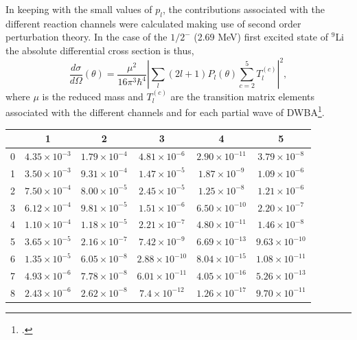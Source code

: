  
 In keeping with the small values of $p_l$,  the  contributions associated with the different reaction channels were calculated making use of second order perturbation theory. In the case of the $1/2^-$ (2.69 MeV) first excited state of $^9$Li the absolute differential cross section is thus,
 \begin{equation}
 \frac{d\sigma}{d\Omega}(\theta)=\frac{\mu^2}{16\pi^3\hbar^4}\left|\sum_l(2l+1)P_l(\theta)\sum_{c=2}^5 T^{(c)}_l\right|^2,
 \end{equation}
 where $\mu$ is the reduced mass and $T^{(c)}_l$ are the transition matrix elements associated with the different channels and for each partial wave of DWBA\footnote{\cite{Satchler:80}.}.
 
 \begin{table}
 	\begin{center}
 		\begin{tabular}{|c|c|c|c|c|c|}
 			\hline
 			\backslashbox {$l$}{$c$} & \textbf{1} & \textbf{2} & \textbf{3} & \textbf{4}& \textbf{5} \\
 			\hline
 			0& $4.35\times 10^{-3}$ &$1.79\times 10^{-4}$ & $4.81\times 10^{-6}$& $2.90\times 10^{-11}$& $3.79\times 10^{-8}$\\
 			\hline
 			1& $3.50\times 10^{-3}$& $9.31\times 10^{-4}$& $1.47\times 10^{-5}$&$1.87\times 10^{-9}$& $1.09\times 10^{-6}$\\
 			\hline
 			2& $7.50 \times 10^{-4}$& $8.00\times 10^{-5}$& $2.45\times 10^{-5}$&$1.25\times 10^{-8}$&$1.21\times 10^{-6}$\\
 			\hline
 			3& $6.12\times 10^{-4}$&$9.81\times 10^{-5}$ & $1.51\times 10^{-6}$&$6.50\times 10^{-10}$&$2.20\times 10^{-7}$\\
 			\hline
 			4&$1.10\times 10^{-4}$ &$ 1.18\times 10^{-5}$ & $2.21\times 10^{-7}$&$4.80\times 10^{-11}$&$1.46\times 10^{-8}$ \\
 			\hline
 			5& $3.65\times 10^{-5}$& $2.16\times 10^{-7}$& $7.42\times 10^{-9}$&$6.69\times 10^{-13}$&$9.63\times 10^{-10}$\\
 			\hline
 			6& $1.35\times 10^{-5}$& $6.05\times 10^{-8}$&$2.88\times 10^{-10}$ &$8.04\times 10^{-15}$&$1.08\times 10^{-11}$\\
 			\hline
 			7& $4.93\times 10^{-6}$& $7.78\times 10^{-8}$& $6.01\times 10^{-11}$&$4.05\times 10^{-16}$&$5.26\times 10^{-13}$\\
 			\hline
 			8& $2.43\times 10^{-6}$& $2.62\times 10^{-8}$& $7.4\times 10^{-12}$&$1.26\times 10^{-17}$&$9.70\times 10^{-11}$\\

\end{tabular}
\end{center}
\end{table}
